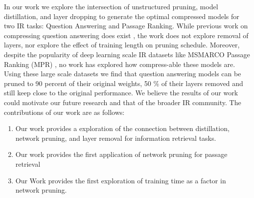 In our work we explore the intersection of unstructured pruning, model distillation, and layer dropping to generate the optimal compressed models for two IR tasks: Question Answering and Passage Ranking. While previous work on compressing question answering does exist \cite{Sanh2020MovementPA}, the work does not explore removal of layers, nor explore the effect of training length on pruning schedule. Moreover, despite the popularity of deep learning scale IR datasets like MSMARCO Passage Ranking (MPR) \cite{Campos2016MSMA}, no work has explored how compress-able these models are. Using these large scale datasets we find that question answering models can be pruned to 90 percent of their original weights, 50 \% of their layers removed and still keep close to the original performance. 
We believe the results of our work could motivate our future research and that of the broader IR community. 
The contributions of our work are as follows:
\begin{enumerate}
    \item Our work provides a exploration of the connection between distillation, network pruning, and layer removal for information retrieval tasks.
    \item Our work provides the first application of network pruning for passage retrieval
    \item Our Work provides the first exploration of training time as a factor in network pruning.
\end{enumerate}